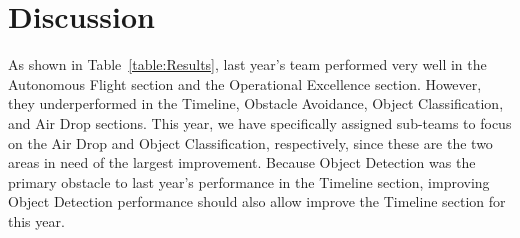 \documentclass[]{auvsi_doc}
\begin{document}
\section{Discussion}
As shown in Table~\ref{table:Results}, last year’s team performed very well in the Autonomous Flight section and the Operational Excellence section. However, they underperformed in the Timeline, Obstacle Avoidance, Object Classification, and Air Drop sections. This year, we have specifically assigned sub-teams to focus on the Air Drop and Object Classification, respectively, since these are the two areas in need of the largest improvement. Because Object Detection was the primary obstacle to last year’s performance in the Timeline section, improving Object Detection performance should also allow improve the Timeline section for this year.
\end{document}

